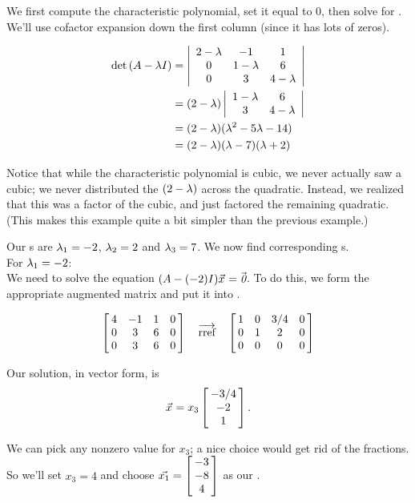 {We first compute the characteristic polynomial, set it equal to 0, then solve for \lda. We'll use cofactor expansion down the first column (since it has lots of zeros).

\begin{align*}
\det{\tta-\lda\tti} &= \bdt{ccc} 2-\lda & -1 & 1 \\0&1-\lda & 6\\ 0 & 3 & 4-\lda \edt \\
										&= (2-\lda)\bdt{cc}1-\lda & 6\\3&4-\lda\edt\\
										&= (2-\lda)(\lda^2-5\lda-14)\\
										&= (2-\lda)(\lda-7)(\lda+2)\\
\end{align*}

Notice that while the characteristic polynomial is cubic, we never actually saw a cubic; we never distributed the $(2-\lda)$ across the quadratic. Instead, we realized that this was a factor of the cubic, and just factored the remaining quadratic. (This makes this example quite a bit simpler than the previous example.)

Our \el s are $\lda_1 = -2$, $\lda_2 = 2$ and $\lda_3 = 7$. We now find corresponding \ev s.\\

For $\lda_1 = -2$:\\



We need to solve the equation $(\tta - (-2)\tti)\vx = \zero$. To do this, we form the appropriate augmented matrix and put it into \rref.

$$\bmx{cccc} 4&-1&1&0\\ 0&3&6&0 \\ 0&3&6&0  \emx \quad \overrightarrow{\text{rref}} \quad \bmx{cccc} 1&0&3/4&0\\0&1&2&0\\0&0&0&0\emx$$

Our solution, in vector form, is $$\vx = x_3\bmx{c} -3/4\\-2\\1\emx.$$



We can pick any nonzero value for $x_3$; a nice choice would get rid of the fractions. So we'll set $x_3 = 4$ and choose $\vx[1]=\bmx{c} -3\\-8\\4\emx$ as our \ev.\\

}
